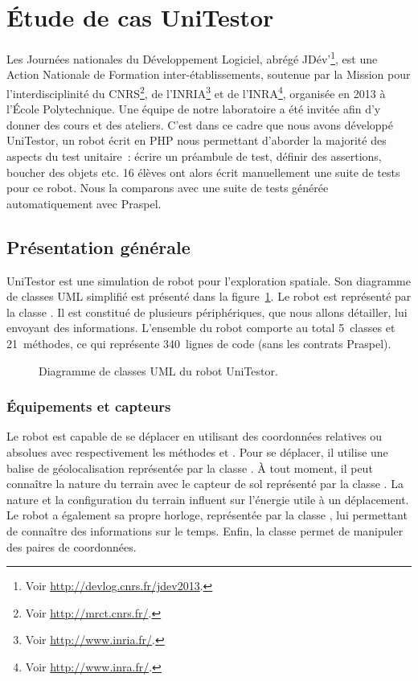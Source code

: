 \section{Étude de cas UniTestor}
\label{section:experimentation:unitestor}

Les Journées nationales du Développement Logiciel, abrégé JDév'\footnote{Voir
\url{http://devlog.cnrs.fr/jdev2013}.}, est une Action Nationale de Formation
inter-établissements, soutenue par la Mission pour l'interdisciplinité du
CNRS\footnote{Voir \url{http://mrct.cnrs.fr/}.}, de l'INRIA\footnote{Voir
\url{http://www.inria.fr/}.} et de l'INRA\footnote{Voir
\url{http://www.inra.fr/}.}, organisée en 2013 à l'École Polytechnique. Une
équipe de notre laboratoire a été invitée afin d'y donner des cours et des
ateliers. C'est dans ce cadre que nous avons développé UniTestor, un robot écrit
en PHP nous permettant d'aborder la majorité des aspects du test unitaire~:
écrire un préambule de test, définir des assertions, boucher des objets etc. 16
élèves ont alors écrit manuellement une suite de tests pour ce robot. Nous la
comparons avec une suite de tests générée automatiquement avec Praspel.

\subsection{Présentation générale}

UniTestor est une simulation de robot pour l'exploration spatiale. Son diagramme
de classes UML simplifié est présenté dans la
figure~\ref{figure:experimentation:unitestor}. Le robot est représenté par la
classe . Il est constitué de plusieurs périphériques, que nous
allons détailler, lui envoyant des informations. L'ensemble du robot comporte au
total 5~classes et 21~méthodes, ce qui représente 340~lignes de code (sans les
contrats Praspel).
%
\begin{figure}


\caption{\label{figure:experimentation:unitestor} Diagramme de classes UML du
robot UniTestor.}

\end{figure}

\subsubsection{Équipements et capteurs}

Le robot est capable de se déplacer en utilisant des coordonnées relatives ou
absolues avec respectivement les méthodes  et . Pour se
déplacer, il utilise une balise de géolocalisation représentée par la classe
. À tout moment, il peut connaître la nature du terrain avec
le capteur de sol représenté par la classe . La nature et la
configuration du terrain influent sur l'énergie utile à un déplacement. Le robot
a également sa propre horloge, représentée par la classe , lui
permettant de connaître des informations sur le temps. Enfin, la classe
 permet de manipuler des paires de coordonnées.

